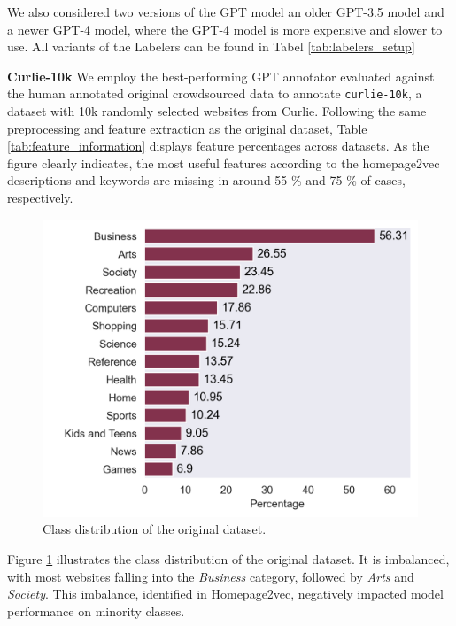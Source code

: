 We also considered two versions of the GPT model an older GPT-3.5 model and a newer GPT-4 model, where the GPT-4 model is more expensive and slower to use.
All variants of the Labelers can be found in Tabel \ref{tab:labelers_setup}


\textbf{Curlie-10k} 
We employ the best-performing GPT annotator evaluated against the human annotated original crowdsourced data to annotate \texttt{curlie-10k}, a dataset with 10k randomly selected websites from Curlie. 
Following the same preprocessing and feature extraction as the original dataset, Table \ref{tab:feature_information} displays feature percentages across datasets. 
As the figure clearly indicates, the most useful features according to the homepage2vec \cite{homepage2vec} descriptions and keywords are missing in around 55 \% and 75 \% of cases, respectively. 

\begin{figure}[!ht]
    \centering
    \includegraphics[width=1\columnwidth]{figures/category_distribution.png}
    \caption{Class distribution of the original dataset.}
    \label{fig:class_distribution}
\end{figure}

Figure \ref{fig:class_distribution} illustrates the class distribution of the original dataset. It is imbalanced, with most websites falling into the \textit{Business} category, followed by \textit{Arts} and \textit{Society}. This imbalance, identified in Homepage2vec, negatively impacted model performance on minority classes.


